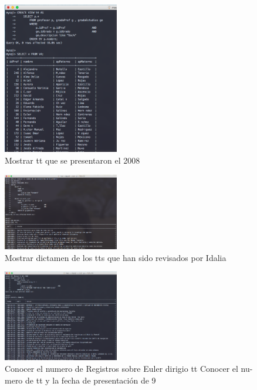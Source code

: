 \documentclass[12pt, fleqn]{article}                             %
\begin{document}
        \begin{figure}[ht!]
            \centering
            \includegraphics[width=0.45\textwidth]{BD6Reporte7}
            \caption{Mostrar tt que se presentaron el 2008}
        \end{figure}


        \begin{figure}[ht!]
            \centering
            \includegraphics[width=0.45\textwidth]{BD6Reporte8}
            \caption{Mostrar dictamen de los tts que han sido revisados por Idalia}
        \end{figure}

        \begin{figure}[ht!]
            \centering
            \includegraphics[width=0.45\textwidth]{BD6Reporte9}
            \caption{Conocer el numero de Registros sobre Euler dirigio tt Conocer el nu-
                mero de tt y la fecha de presentación de 9}
        \end{figure}
\end{document}

